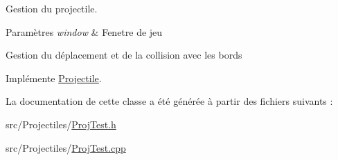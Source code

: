 Gestion du projectile. 


\begin{DoxyParams}{Paramètres}
{\em window} & Fenetre de jeu\\
\hline
\end{DoxyParams}
Gestion du déplacement et de la collision avec les bords 

Implémente \hyperlink{class_projectile_aa969857f9837d9be3a6ea415c9ba3ff1}{Projectile}.



La documentation de cette classe a été générée à partir des fichiers suivants \+:\begin{DoxyCompactItemize}
\item 
src/\+Projectiles/\hyperlink{_proj_test_8h}{Proj\+Test.\+h}\item 
src/\+Projectiles/\hyperlink{_proj_test_8cpp}{Proj\+Test.\+cpp}\end{DoxyCompactItemize}
